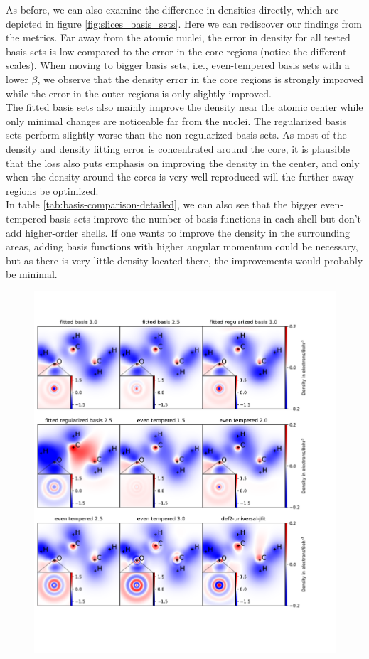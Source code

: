 {\begin{figure}
\end{figure}
As before, we can also examine the difference in densities directly, which are depicted in figure \ref{fig:slices_basis_sets}. Here we can rediscover our findings from the metrics. Far away from the atomic nuclei, the error in density for all tested basis sets is low compared to the error in the core regions (notice the different scales). When moving to bigger basis sets, i.e., even-tempered basis sets with a lower $\beta$, we observe that the density error in the core regions is strongly improved while the error in the outer regions is only slightly improved.\\
The fitted basis sets also mainly improve the density near the atomic center while only minimal changes are noticeable far from the nuclei. The regularized basis sets perform slightly worse than the non-regularized basis sets. As most of the density and density fitting error is concentrated around the core, it is plausible that the loss also puts emphasis on improving the density in the center, and only when the density around the cores is very well reproduced will the further away regions be optimized.
\\In table \ref{tab:basis-comparison-detailed}, we can also see that the bigger even-tempered basis sets improve the number of basis functions in each shell but don't add higher-order shells. If one wants to improve the density in the surrounding areas, adding basis functions with higher angular momentum could be necessary, but as there is very little density located there, the improvements would probably be minimal.\\
 \begin{figure}
   \centering
   \includegraphics[width=1\textwidth]{chapters/results/results_images/basis_set_slices.pdf}

\end{figure}}
